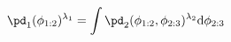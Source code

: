 \begin{equation}
  \pd_{1}(\phi_{1:2})^{\lambda_{1}} = \int \pd_{2}(\phi_{1:2}, \phi_{2:3})^{\lambda_{2}} \text{d}\phi_{2:3}
  \label{eqn:marginal-pooling-weights}
\end{equation}